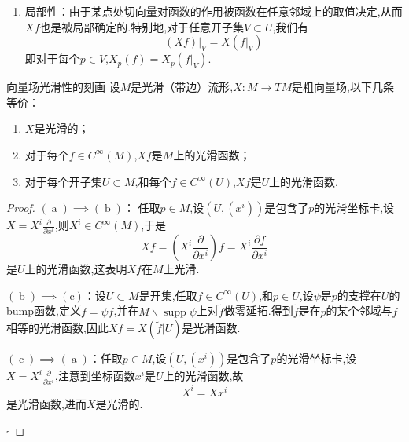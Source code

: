 \documentclass[../../几何与拓扑.tex]{subfiles}
\begin{document}
\begin{remark}
    \begin{enumerate}
        \item 局部性：由于某点处切向量对函数的作用被函数在任意邻域上的取值决定,从而$Xf$也是被局部确定的.特别地,对于任意开子集$V\subset U$,我们有 $$ \left( Xf \right) |_{V}= X\left( f|_{V} \right)  $$即对于每个$p \in V$,$X_{p}\left( f \right)=X_{p}\left(f|_{V}  \right)$.
    \end{enumerate}
    
\end{remark}

\begin{proposition}{向量场光滑性的刻画}
    设$M$是光滑（带边）流形,$X:M\to TM$是粗向量场,以下几条等价：
    \begin{enumerate}
        \item $X$是光滑的；
        \item 对于每个$f \in C^{\infty}\left( M \right)$,$Xf$是$M$上的光滑函数；
        \item 对于每个开子集$U\subset M$,和每个$f \in C^{\infty}\left( U \right)$,$Xf$是$U$上的光滑函数.
    \end{enumerate}
    
\end{proposition}

\begin{proof}
    $\left( \operatorname{a} \right)\implies \left( \operatorname{b} \right)$：
任取$p \in M$,设$\left( U,\left( x^{i} \right) \right)$是包含了$p$的光滑坐标卡,设$X= X^{i} \frac{ \partial  }{ \partial x^{i} }$,则$X^{i} \in C^{\infty}\left( M \right)$,于是 $$ Xf=\left( X^{i}\frac{ \partial  }{ \partial x^{i} }  \right) f=X^{i}\frac{ \partial f }{ \partial x^{i} }  $$是$U$上的光滑函数,这表明$Xf$在$M$上光滑.

$\left( \operatorname{b} \right)\implies \operatorname{\left( c \right)}$：设$U\subset M$是开集,任取$f \in C^{\infty}\left( U \right)$,和$p \in U$,设$\psi$是$p$的支撑在$U$的bump函数,定义$\tilde{f}=\psi f$,并在$M\backslash \operatorname{supp}\psi$上对$\tilde{f}$做零延拓.得到$\tilde{f}$是在$p$的某个邻域与$f$相等的光滑函数,因此$Xf=X \left( \tilde{f}|U \right)$是光滑函数.

$\left( \operatorname{c} \right)\implies \left( \operatorname{a} \right)$：任取$p \in M$,设$\left( U,\left( x^{i} \right) \right)$是包含了$p$的光滑坐标卡,设$X= X^{i}\frac{ \partial  }{ \partial x^{i} }$,注意到坐标函数$x^{i}$是$U$上的光滑函数,故 $$ X^{i}=X x^{i} $$是光滑函数,进而$X$是光滑的.

    \hfill $\square$
\end{proof}
\end{document}
